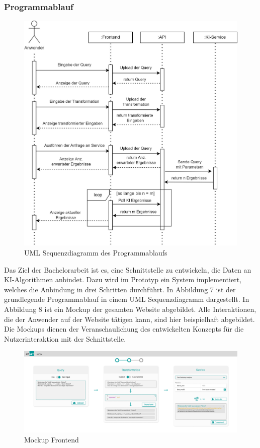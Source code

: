 \subsubsection{Programmablauf}
\begin{figure}[H]
  \centering
    \includegraphics[width = 15cm]{bilder/ArchitekturSequenz}
    \caption{UML Sequenzdiagramm des Programmablaufs}
\end{figure}

Das Ziel der Bachelorarbeit ist es, eine Schnittstelle zu entwickeln, die Daten an KI-Algorithmen anbindet. Dazu wird im Prototyp ein System implementiert, welches die Anbindung in drei Schritten durchführt. In Abbildung 7 ist der grundlegende Programmablauf in einem UML Sequenzdiagramm dargestellt. In Abbildung 8 ist ein Mockup der gesamten Website abgebildet. Alle Interaktionen, die der Anwender auf der Website tätigen kann, sind hier beispielhaft abgebildet. Die Mockups dienen der Veranschaulichung des entwickelten Konzepts für die Nutzerinteraktion mit der Schnittstelle. 

\begin{figure}[H]
  \centering
    \includegraphics[width = 15cm]{bilder/mockup}
    \caption{Mockup Frontend}
\end{figure}

